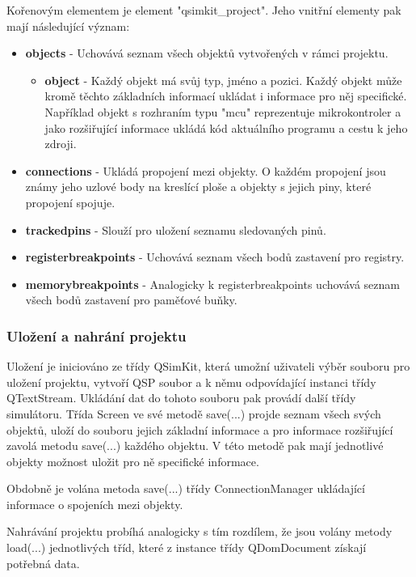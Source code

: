 Kořenovým elementem je element "qsimkit\_project". Jeho vnitřní elementy pak mají následující význam:

\begin{itemize}
\item \textbf{objects} - Uchovává seznam všech objektů vytvořených v rámci projektu.
\begin{itemize}
\item \textbf{object} - Každý objekt má svůj typ, jméno a pozici. Každý objekt může kromě těchto základních informací ukládat i informace pro něj specifické. Například objekt s rozhraním typu "mcu" reprezentuje mikrokontroler a jako rozšiřující informace ukládá kód aktuálního programu a cestu k jeho zdroji.
\end{itemize}
\item \textbf{connections} - Ukládá propojení mezi objekty. O každém propojení jsou známy jeho uzlové body na kreslící ploše a objekty s jejich piny, které propojení spojuje.
\item \textbf{trackedpins} - Slouží pro uložení seznamu sledovaných pinů.
\item \textbf{registerbreakpoints} - Uchovává seznam všech bodů zastavení pro registry. 
\item \textbf{memorybreakpoints} - Analogicky k registerbreakpoints uchovává seznam všech bodů zastavení pro paměťové buňky.
\end{itemize}


\subsubsection{Uložení a nahrání projektu}

Uložení je iniciováno ze třídy QSimKit, která umožní uživateli výběr souboru pro uložení projektu, vytvoří QSP soubor a k němu odpovídající instanci třídy QTextStream. Ukládání dat do tohoto souboru pak provádí další třídy simulátoru. Třída Screen ve své metodě save(...) projde seznam všech svých objektů, uloží do souboru jejich základní informace a pro informace rozšiřující zavolá metodu save(...) každého objektu. V této metodě pak mají jednotlivé objekty možnost uložit pro ně specifické informace.

Obdobně je volána metoda save(...) třídy ConnectionManager ukládající informace o spojeních mezi objekty.

Nahrávání projektu probíhá analogicky s tím rozdílem, že jsou volány metody load(...) jednotlivých tříd, které z instance třídy QDomDocument získají potřebná data.

